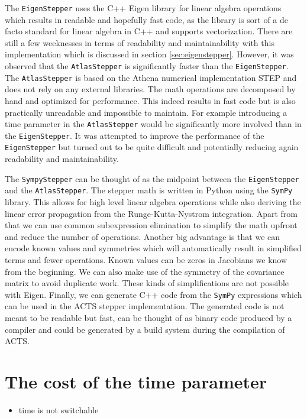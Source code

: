 The \texttt{EigenStepper} uses the C++ Eigen library for linear algebra operations which results in readable and hopefully fast code, as the library is sort of a de facto standard for linear algebra in C++ and supports vectorization. There are still a few weeknesses in terms of readability and maintainability with this implementation which is discussed in section \ref{sec:eigenstepper}. However, it was observed that the \texttt{AtlasStepper} is significantly faster than the \texttt{EigenStepper}. The \texttt{AtlasStepper} is based on the Athena numerical implementation STEP and does not rely on any external libraries. The math operations are decomposed by hand and optimized for performance. This indeed results in fast code but is also practically unreadable and impossible to maintain. For example introducing a time parameter in the \texttt{AtlasStepper} would be significantly more involved than in the \texttt{EigenStepper}. It was attempted to improve the performance of the \texttt{EigenStepper} but turned out to be quite difficult and potentially reducing again readability and maintainability.

The \texttt{SympyStepper} can be thought of as the midpoint between the \texttt{EigenStepper} and the \texttt{AtlasStepper}. The stepper math is written in Python using the \texttt{SymPy} library. This allows for high level linear algebra operations while also deriving the linear error propagation from the Runge-Kutta-Nystrom integration. Apart from that we can use common subexpression elimination to simplify the math upfront and reduce the number of operations. Another big advantage is that we can encode known values and symmetries which will automatically result in simplified terms and fewer operations. Known values can be zeros in Jacobians we know from the beginning. We can also make use of the symmetry of the covariance matrix to avoid duplicate work. These kinds of simplifications are not possible with Eigen. Finally, we can generate C++ code from the \texttt{SymPy} expressions which can be used in the ACTS stepper implementation. The generated code is not meant to be readable but fast, can be thought of as binary code produced by a compiler and could be generated by a build system during the compilation of ACTS.

\section{The cost of the time parameter}

\begin{itemize}
    \color{red}
    \item time is not switchable
\end{itemize}

